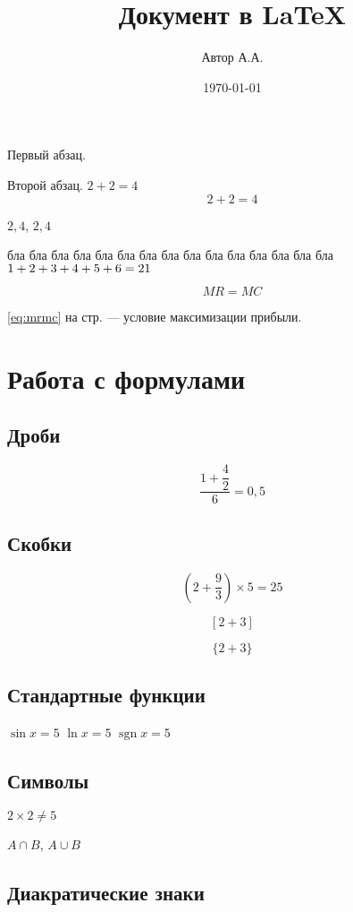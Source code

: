 \documentclass[a4paper,12pt]{article}
\author{Автор А.А.}
\title{Документ в \LaTeX{}}
\date{\today}
\DeclareMathOperator{\sgn}{\mathop{sgn}}
\newcommand*{\hm}[1]{#1\nobreak\discretionary{}
	{\hbox{$\mathsurround=0pt #1$}}{}}
\begin{document}
	\maketitle
Первый абзац.

Второй абзац.
$2+2=4$
\[2+2=4\]

$2,4$, $2, 4$

бла бла бла бла бла бла бла бла бла бла бла бла бла бла бла $1+2\hm{+}3+4+5+6=21$

\begin{equation}\label{eq:mrmc}
	MR=MC
\end{equation}

\eqref{eq:mrmc} на стр. \pageref{eq:mrmc} --- условие максимизации прибыли.

\section{Работа с формулами}

\subsection{Дроби}

\[\frac{1+\dfrac{4}{2}}{6} = 0,5\] 

\subsection{Скобки}

\[ \left(2+\frac{9}{3}\right) \times 5 = 25\]

\[ [2+3] \]

\[ \{2+3\}\]

\subsection{Стандартные функции}

$\sin x = 5$
$\ln x = 5$
$\sgn x = 5$

\subsection{Символы}

$2 \times 2 \ne 5$

$A \cap B$, $A \cup B$

\subsection{Диакратические знаки}
\end{document}
